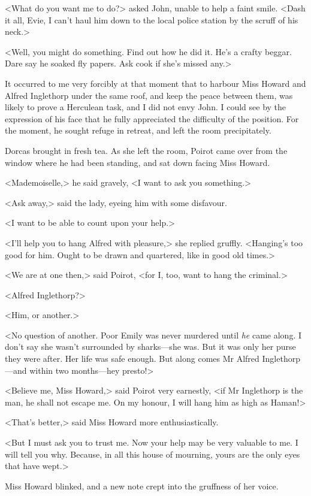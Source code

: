  <What do you want me to do?> asked John, unable to help a faint smile. <Dash it all, Evie, I can't haul him down to the local police station by the scruff of his neck.> 

 <Well, you might do something. Find out how he did it. He's a crafty beggar. Dare say he soaked fly papers. Ask cook if she's missed any.> 

 It occurred to me very forcibly at that moment that to harbour Miss Howard and Alfred Inglethorp under the same roof, and keep the peace between them, was likely to prove a Herculean task, and I did not envy John. I could see by the expression of his face that he fully appreciated the difficulty of the position. For the moment, he sought refuge in retreat, and left the room precipitately. 

 Dorcas brought in fresh tea. As she left the room, Poirot came over from the window where he had been standing, and sat down facing Miss Howard. 

 <Mademoiselle,> he said gravely, <I want to ask you something.> 

 <Ask away,> said the lady, eyeing him with some disfavour. 

 <I want to be able to count upon your help.> 

 <I'll help you to hang Alfred with pleasure,> she replied gruffly. <Hanging's too good for him. Ought to be drawn and quartered, like in good old times.> 

 <We are at one then,> said Poirot, <for I, too, want to hang the criminal.> 

 <Alfred Inglethorp?> 

 <Him, or another.> 

 <No question of another. Poor Emily was never murdered until \emph{he} came along. I don't say she wasn't surrounded by sharks—she was. But it was only her purse they were after. Her life was safe enough. But along comes Mr Alfred Inglethorp—and within two months—hey presto!> 

 <Believe me, Miss Howard,> said Poirot very earnestly, <if Mr Inglethorp is the man, he shall not escape me. On my honour, I will hang him as high as Haman!> 

 <That's better,> said Miss Howard more enthusiastically. 

 <But I must ask you to trust me. Now your help may be very valuable to me. I will tell you why. Because, in all this house of mourning, yours are the only eyes that have wept.> 

 Miss Howard blinked, and a new note crept into the gruffness of her voice. 

